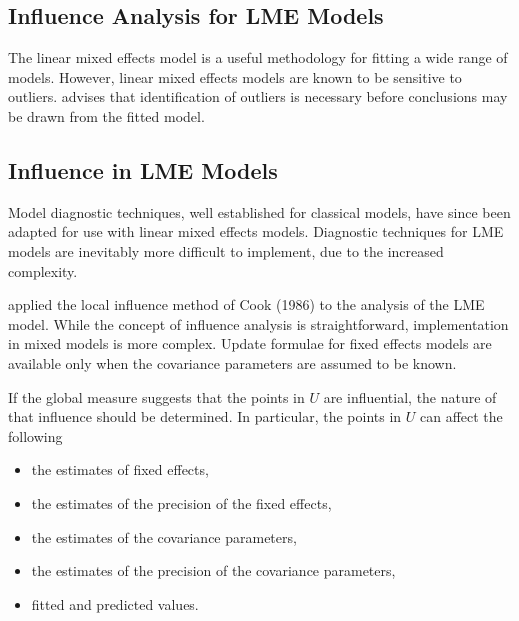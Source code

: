 \documentclass[Main.tex]{subfiles}
\begin{document}
		
		
		\subsection{Influence Analysis for LME Models} %
		The linear mixed effects model is a useful methodology for fitting a wide range of models. However, linear mixed effects models are known to be sensitive to outliers. \citet{CPJ} advises that identification of outliers is necessary before conclusions may be drawn from the fitted model.
		\subsection{Influence in LME Models}
		
		Model diagnostic techniques, well established for classical models, have since been adapted for use with linear mixed effects models. Diagnostic techniques for LME models are inevitably more difficult to implement, due to the increased complexity.
		
		
	
		
		\citet{Beckman} applied the local influence method of Cook (1986) to the analysis of the LME model.
		While the concept of influence analysis is straightforward, implementation in mixed models is more complex. Update formulae for fixed effects models are available only when the covariance parameters are assumed to be known.
		
		If the global measure suggests that the points in $U$ are influential, the nature of that influence should be determined. In particular, the points in $U$ can affect the following
		
		\begin{itemize}
			\item the estimates of fixed effects,
			\item the estimates of the precision of the fixed effects,
			\item the estimates of the covariance parameters,
			\item the estimates of the precision of the covariance parameters,
			\item fitted and predicted values.
		\end{itemize}
		\newpage
\end{document}
